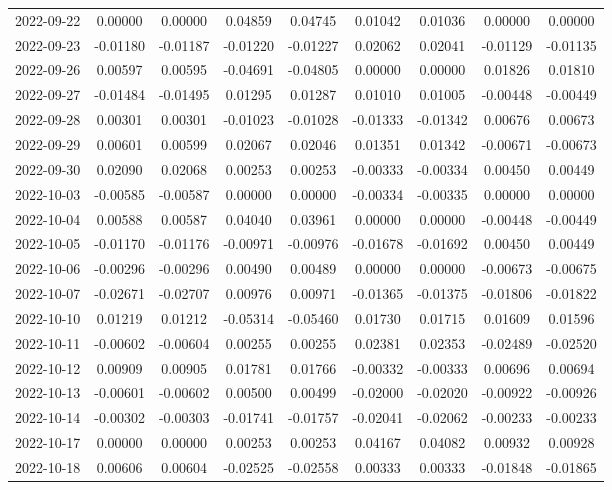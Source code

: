 \begin{footnotesize}
\begin{longtable}{lcccccccc}
2022-09-22 & 0.00000 & 0.00000 & 0.04859 & 0.04745 & 0.01042 & 0.01036 & 0.00000 & 0.00000 \\
2022-09-23 & -0.01180 & -0.01187 & -0.01220 & -0.01227 & 0.02062 & 0.02041 & -0.01129 & -0.01135 \\
2022-09-26 & 0.00597 & 0.00595 & -0.04691 & -0.04805 & 0.00000 & 0.00000 & 0.01826 & 0.01810 \\
2022-09-27 & -0.01484 & -0.01495 & 0.01295 & 0.01287 & 0.01010 & 0.01005 & -0.00448 & -0.00449 \\
2022-09-28 & 0.00301 & 0.00301 & -0.01023 & -0.01028 & -0.01333 & -0.01342 & 0.00676 & 0.00673 \\
2022-09-29 & 0.00601 & 0.00599 & 0.02067 & 0.02046 & 0.01351 & 0.01342 & -0.00671 & -0.00673 \\
2022-09-30 & 0.02090 & 0.02068 & 0.00253 & 0.00253 & -0.00333 & -0.00334 & 0.00450 & 0.00449 \\
2022-10-03 & -0.00585 & -0.00587 & 0.00000 & 0.00000 & -0.00334 & -0.00335 & 0.00000 & 0.00000 \\
2022-10-04 & 0.00588 & 0.00587 & 0.04040 & 0.03961 & 0.00000 & 0.00000 & -0.00448 & -0.00449 \\
2022-10-05 & -0.01170 & -0.01176 & -0.00971 & -0.00976 & -0.01678 & -0.01692 & 0.00450 & 0.00449 \\
2022-10-06 & -0.00296 & -0.00296 & 0.00490 & 0.00489 & 0.00000 & 0.00000 & -0.00673 & -0.00675 \\
2022-10-07 & -0.02671 & -0.02707 & 0.00976 & 0.00971 & -0.01365 & -0.01375 & -0.01806 & -0.01822 \\
2022-10-10 & 0.01219 & 0.01212 & -0.05314 & -0.05460 & 0.01730 & 0.01715 & 0.01609 & 0.01596 \\
2022-10-11 & -0.00602 & -0.00604 & 0.00255 & 0.00255 & 0.02381 & 0.02353 & -0.02489 & -0.02520 \\
2022-10-12 & 0.00909 & 0.00905 & 0.01781 & 0.01766 & -0.00332 & -0.00333 & 0.00696 & 0.00694 \\
2022-10-13 & -0.00601 & -0.00602 & 0.00500 & 0.00499 & -0.02000 & -0.02020 & -0.00922 & -0.00926 \\
2022-10-14 & -0.00302 & -0.00303 & -0.01741 & -0.01757 & -0.02041 & -0.02062 & -0.00233 & -0.00233 \\
2022-10-17 & 0.00000 & 0.00000 & 0.00253 & 0.00253 & 0.04167 & 0.04082 & 0.00932 & 0.00928 \\
2022-10-18 & 0.00606 & 0.00604 & -0.02525 & -0.02558 & 0.00333 & 0.00333 & -0.01848 & -0.01865 \\

\end{longtable}
\end{footnotesize}
